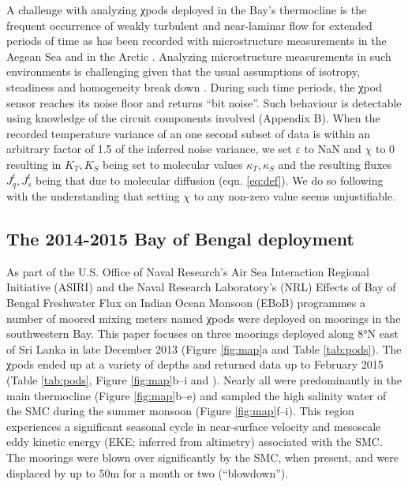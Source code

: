 \documentclass[twocol]{ametsoc}
\begin{document}
A  challenge with analyzing χpods deployed in the Bay's thermocline is the frequent occurrence of weakly turbulent and near-laminar flow for extended periods of time as has been recorded with microstructure measurements in the Aegean Sea \citep{Gregg2012} and in the Arctic \citep{Scheifele2018}.
Analyzing microstructure measurements in such environments is challenging given that the usual assumptions of isotropy, steadiness and homogeneity break down \citep{Rohr1988,Itsweire1993,Gargett1984a}.
During such time periods, the χpod sensor reaches its noise floor and returns ``bit noise''.
Such behaviour is detectable using knowledge of the  circuit components involved (Appendix B).
When the recorded temperature variance of an one second subset of data is within an arbitrary factor of 1.5 of the inferred noise variance, we set \(ε\) to NaN and \(χ\) to 0 resulting in \(K_T, K_S\)  being set to molecular values \(κ_T, κ_S\) and the resulting fluxes \(J_q^t, J_s^t\) being that due to molecular diffusion (eqn. \ref{eq:def}).
We do so following \cite{Gregg2012} with the understanding that setting \(χ\) to any non-zero value seems unjustifiable.


\subsection{The 2014-2015 Bay of Bengal deployment}
\label{sec:org46e574a}

As part of the U.S. Office of Naval Research's Air Sea Interaction Regional Initiative (ASIRI) and the Naval Research Laboratory's (NRL) Effects of Bay of Bengal Freshwater Flux on Indian Ocean Monsoon (EBoB) programmes a number of moored mixing meters named χpods \citep{Moum2009a} were deployed on moorings in the southwestern Bay.
This paper focuses on three moorings deployed along 8°N east of Sri Lanka in late December 2013 (Figure \ref{fig:map}a and Table \ref{tab:pods}).
The χpods ended up at a variety of depths and returned data up to February 2015 (Table \ref{tab:pods}, Figure \ref{fig:map}b--i and \citealp{Wijesekera2016a}).
Nearly all were predominantly in the main thermocline (Figure \ref{fig:map}b--e) and sampled the high salinity water of the SMC during the summer monsoon (Figure \ref{fig:map}f--i).
This region experiences a significant seasonal cycle in near-surface velocity and mesoscale eddy kinetic energy (EKE; inferred from altimetry) associated with the SMC.
The moorings were blown over significantly by the SMC, when present, and were displaced by up to 50m for a month or two (``blowdown'').
\end{document}
